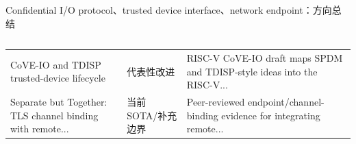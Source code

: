 \begin{frame}[t,shrink=6]{Confidential I/O protocol、trusted device interface、network endpoint：方向总结}
\begin{columns}[T,totalwidth=\textwidth]
\begin{column}{0.49\textwidth}
{\begin{minipage}[t]{0.97\linewidth}
\begin{minipage}{0.92\linewidth}
{\begin{tabularx}{\linewidth}{@{}YYY@{}}
CoVE-IO and TDISP trusted-device lifecycle & 代表性改进 & RISC-V CoVE-IO draft maps SPDM and TDISP-style ideas into the RISC-V... \\
Separate but Together: TLS channel binding with remote... & 当前 SOTA/补充边界 & Peer-reviewed endpoint/channel-binding evidence for integrating remote... \\
\bottomrule
\end{tabularx}
}
    \end{minipage}
    \vspace{1mm}
  \end{minipage}}
  \end{column}
\end{columns}
\end{frame}
